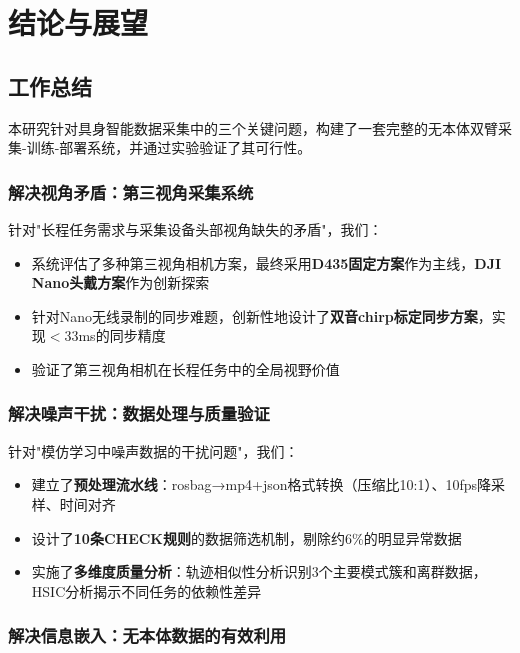 \section{结论与展望}

\subsection{工作总结}

本研究针对具身智能数据采集中的三个关键问题，构建了一套完整的无本体双臂采集-训练-部署系统，并通过实验验证了其可行性。

\subsubsection{解决视角矛盾：第三视角采集系统}

针对"长程任务需求与采集设备头部视角缺失的矛盾"，我们：
\begin{itemize}[leftmargin=2em]
    \item 系统评估了多种第三视角相机方案，最终采用\textbf{D435固定方案}作为主线，\textbf{DJI Nano头戴方案}作为创新探索
    \item 针对Nano无线录制的同步难题，创新性地设计了\textbf{双音chirp标定同步方案}，实现$<$33ms的同步精度
    \item 验证了第三视角相机在长程任务中的全局视野价值
\end{itemize}

\subsubsection{解决噪声干扰：数据处理与质量验证}

针对"模仿学习中噪声数据的干扰问题"，我们：
\begin{itemize}[leftmargin=2em]
    \item 建立了\textbf{预处理流水线}：rosbag→mp4+json格式转换（压缩比10:1）、10fps降采样、时间对齐
    \item 设计了\textbf{10条CHECK规则}的数据筛选机制，剔除约6\%的明显异常数据
    \item 实施了\textbf{多维度质量分析}：轨迹相似性分析识别3个主要模式簇和离群数据，HSIC分析揭示不同任务的依赖性差异
\end{itemize}

\subsubsection{解决信息嵌入：无本体数据的有效利用}

